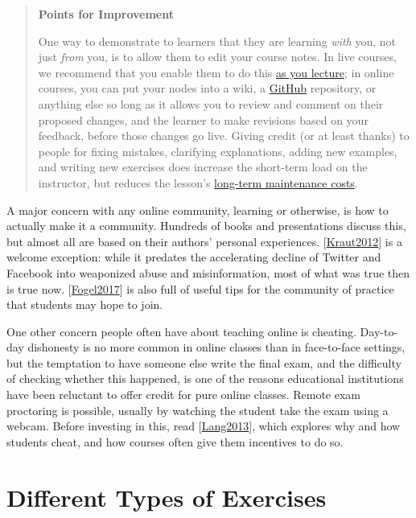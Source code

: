 \documentclass[10pt,statementpaper]{memoir}
\begin{document}
\begin{quote}
\textbf{Points for Improvement}

One way to demonstrate to learners that they are learning \emph{with}
you, not just \emph{from} you, is to allow them to edit your course
notes. In live courses, we recommend that you enable them to do this
\href{practices.html\#take-notes-together}{as you lecture}; in online
courses, you can put your nodes into a wiki, a
\href{http://github.com}{GitHub} repository, or anything else so long as
it allows you to review and comment on their proposed changes, and the
learner to make revisions based on your feedback, before those changes
go live. Giving credit (or at least thanks) to people for fixing
mistakes, clarifying explanations, adding new examples, and writing new
exercises does increase the short-term load on the instructor, but
reduces the lesson's \href{lessons.html\#maintainability}{long-term
maintenance costs}.
\end{quote}

A major concern with any online community, learning or otherwise, is how
to actually make it a community. Hundreds of books and presentations
discuss this, but almost all are based on their authors' personal
experiences. {[}\href{biblio.html\#kraut-resnick-online}{Kraut2012}{]}
is a welcome exception: while it predates the accelerating decline of
Twitter and Facebook into weaponized abuse and misinformation, most of
what was true then is true now.
{[}\href{biblio.html\#fogel-poss}{Fogel2017}{]} is also full of useful
tips for the community of practice that students may hope to join.

One other concern people often have about teaching online is cheating.
Day-to-day dishonesty is no more common in online classes than in
face-to-face settings, but the temptation to have someone else write the
final exam, and the difficulty of checking whether this happened, is one
of the reasons educational institutions have been reluctant to offer
credit for pure online classes. Remote exam proctoring is possible,
usually by watching the student take the exam using a webcam. Before
investing in this, read
{[}\href{biblio.html\#lang-cheating}{Lang2013}{]}, which explores why
and how students cheat, and how courses often give them incentives to do
so.

\section{Different Types of
Exercises}\label{different-types-of-exercises}
\end{document}
